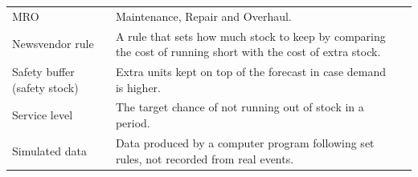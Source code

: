 \documentclass[12pt,oneside]{report}
\begin{document}
\begin{singlespace}
\begin{longtable}{@{}p{3.6cm}p{9.2cm}r@{}}
MRO & Maintenance, Repair and Overhaul. & \pageref{gl:mro}\\
Newsvendor rule & A rule that sets how much stock to keep by comparing the cost of running short with the cost of extra stock. & \pageref{gl:newsvendor}\\
Safety buffer (safety stock) & Extra units kept on top of the forecast in case demand is higher. & \pageref{gl:buffer}\\
Service level & The target chance of not running out of stock in a period. & \pageref{gl:service}\\
Simulated data & Data produced by a computer program following set rules, not recorded from real events. & \pageref{gl:sim}\\
\bottomrule
\end{longtable}
\end{singlespace}
\end{document}
